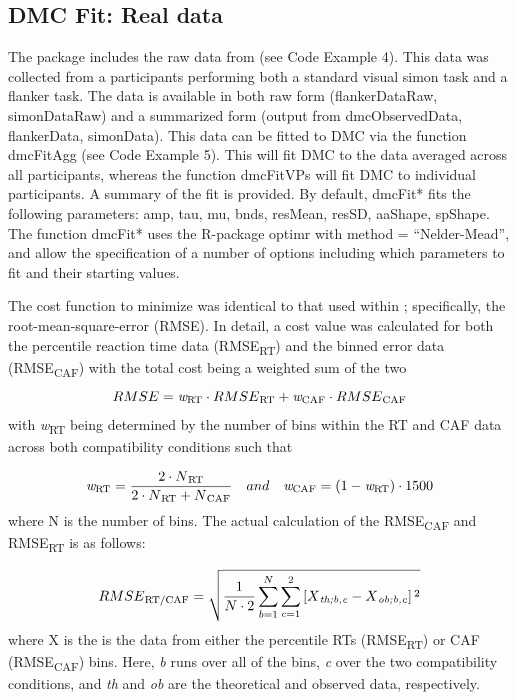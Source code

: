 \subsection{DMC Fit: Real data} 
\label{dmc_fit} 

The package includes the raw data from \textcite{ulrich2015automatic} (see Code
Example 4). This data was collected from a participants performing both a
standard visual simon task and a flanker task. The data is available in both
raw form (flankerDataRaw, simonDataRaw) and a summarized form (output from
dmcObservedData, flankerData, simonData). This data can be fitted to DMC via
the function dmcFitAgg (see Code Example 5). This will fit DMC to the data
averaged across all participants, whereas the function dmcFitVPs will fit DMC
to individual participants. A summary of the fit is provided. By default,
dmcFit* fits the following parameters: amp, tau, mu, bnds, resMean, resSD,
aaShape, spShape. The function dmcFit* uses the R-package optimr
\parencite{optimr} with method = ``Nelder-Mead'', and allow the specification of a
number of options including which parameters to fit and their starting values. 
   
The cost function to minimize was identical to that used within
\textcite{ulrich2015automatic}; specifically, the root-mean-square-error
(RMSE). In detail, a cost value was calculated for both the percentile reaction time data
(RMSE\textsubscript{RT}) and the binned error data (RMSE\textsubscript{CAF}) with the
total cost being a weighted sum of the two
\begin{equation*}
    RMSE = \textit{w}\textsubscript{RT} \cdot RMSE\textsubscript{RT} + \textit{w}\textsubscript{CAF} \cdot RMSE\textsubscript{CAF}  
\end{equation*}
with \textit{w}\textsubscript{RT} being determined by the number of bins 
within the RT and CAF data across both compatibility conditions such that 

\begin{equation*}
    \textit{w}\textsubscript{RT} = \frac{2 \cdot N\textsubscript{RT}} {2 \cdot N\textsubscript{RT} + N\textsubscript{CAF}} \quad and \quad  \textit{w}\textsubscript{CAF} = (1 - \textit{w}\textsubscript{RT}) \cdot 1500
\end{equation*}
where N is the number of bins. The actual calculation of the RMSE\textsubscript{CAF} and
RMSE\textsubscript{RT} is as follows:

\begin{equation*}
    RMSE\textsubscript{RT/CAF} = \sqrt{\frac{1}{N\cdot2} \sum_{b=1}^{N} \sum_{c=1}^{2} \left[X\textsubscript{\textit{th;b,c}} - X\textsubscript{\textit{ob;b,c}} \right] \textsuperscript{2}} 
\end{equation*}
where X is the is the data from either the percentile RTs
(RMSE\textsubscript{RT}) or CAF (RMSE\textsubscript{CAF}) bins. Here,
\textit{b} runs over all of the bins, \textit{c} over the two compatibility
conditions, and \textit{th} and \textit{ob} are the theoretical and observed
data, respectively. 

